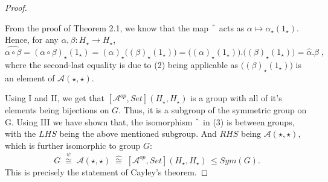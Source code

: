 \documentclass[a4paper]{article}
\theoremstyle{definition}
\begin{document}
\begin{proof}
\begin{enumerate}[label=\Roman*]
					From the proof of Theorem 2.1, we know that the map
					$\string ^$ acts as $\alpha \mapsto \alpha_\star (1_\star)$.
					Hence, for any $\alpha,\beta:H_\star \to H_\star$,
					\begin{equation}
						\widehat {\alpha \circ \beta}= (\alpha \circ \beta)_\star(1_\star)
						=(\alpha)_\star \Big( (\beta)_\star (1_\star) \Big)=
						\Big((\alpha)_\star(1_\star) \Big) . \Big( (\beta)_\star (1_\star) \Big)
						=\hat{\alpha} . \hat{\beta}\;,
					\end{equation}
					where the second-last equality is due to (2) being applicable
					as $\Big((\beta)_\star (1_\star)\Big)$ is an element of $\mathcal{A} (\star,\star)$.
			\end{enumerate}

			Using I and II, we get that $[ \mathcal{A} ^{op}, Set](H_\star,H_\star)$
			is a group with all of it's elements being bijections on $G$.
			Thus, it is a subgroup of the symmetric group on G.
			Using III we have shown that, the isomorphism $\string ^$ in (3) is between groups,
			with the $LHS$ being the above mentioned subgroup.
			And $RHS$ being $\mathcal{A} (\star, \star)$, which is further
			isomorphic to group $G$:
		\[ G \; \overset{\psi}{\cong} \; \mathcal{A} (\star,\star) \; \hat{\cong} \;
			[ \mathcal{A} ^{op}, Set](H_\star,H_\star)\, \leq Sym(G).\]
			This is	precisely the statement of Cayley's theorem.\qedhere
		\end{proof}
\end{document}
